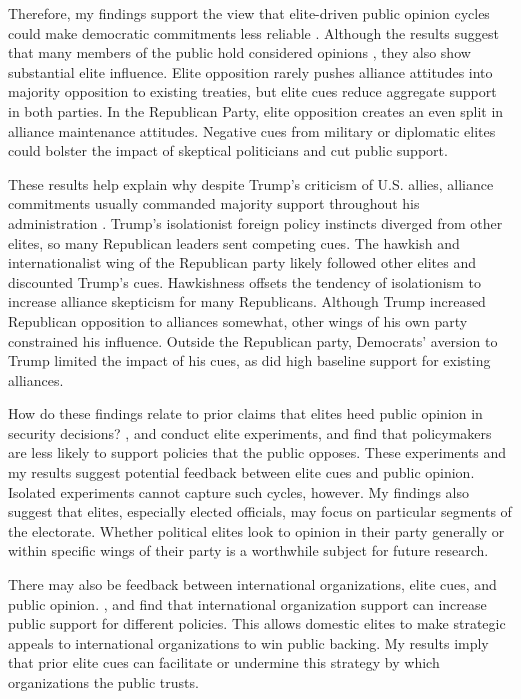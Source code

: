 \documentclass[12pt]{article}
\begin{document}
Therefore, my findings support the view that elite-driven public opinion cycles could make democratic commitments less reliable \citep{GartzkeGleditsch2004}. 
Although the results suggest that many members of the public hold considered opinions \citep{PageShapiro1992}, they also show substantial elite influence. 
Elite opposition rarely pushes alliance attitudes into majority opposition to existing treaties, but elite cues reduce aggregate support in both parties.
In the Republican Party, elite opposition creates an even split in alliance maintenance attitudes. 
Negative cues from military or diplomatic elites could bolster the impact of skeptical politicians and cut public support. 


These results help explain why despite Trump's criticism of U.S. allies, alliance commitments usually commanded majority support throughout his administration \citep{PewNATO2020}. 
Trump's isolationist foreign policy instincts diverged from other elites, so many Republican leaders sent competing cues.
The hawkish and internationalist wing of the Republican party likely followed other elites and discounted Trump's cues. 
Hawkishness offsets the tendency of isolationism to increase alliance skepticism for many Republicans.
Although Trump increased Republican opposition to alliances somewhat, other wings of his own party constrained his influence.
Outside the Republican party, Democrats' aversion to Trump limited the impact of his cues, as did high baseline support for existing alliances. 


How do these findings relate to prior claims that elites heed public opinion in security decisions?
\citet{Tomzetal2020}, \citet{LinGreenberg2021} and \citet{ChuRechhia2021} conduct elite experiments, and find that policymakers are less likely to support policies that the public opposes.
These experiments and my results suggest potential feedback between elite cues and public opinion.
Isolated experiments cannot capture such cycles, however. 
My findings also suggest that elites, especially elected officials, may focus on particular segments of the electorate. 
Whether political elites look to opinion in their party generally or within specific wings of their party is a worthwhile subject for future research.


There may also be feedback between international organizations, elite cues, and public opinion.
\citet{Griecoetal2011}, \citet{Greenhill2020} and \citet{RecchiaChu2021} find that international organization support can increase public support for different policies. 
This allows domestic elites to make strategic appeals to international organizations to win public backing.
My results imply that prior elite cues can facilitate or undermine this strategy by which organizations the public trusts.
\end{document}
